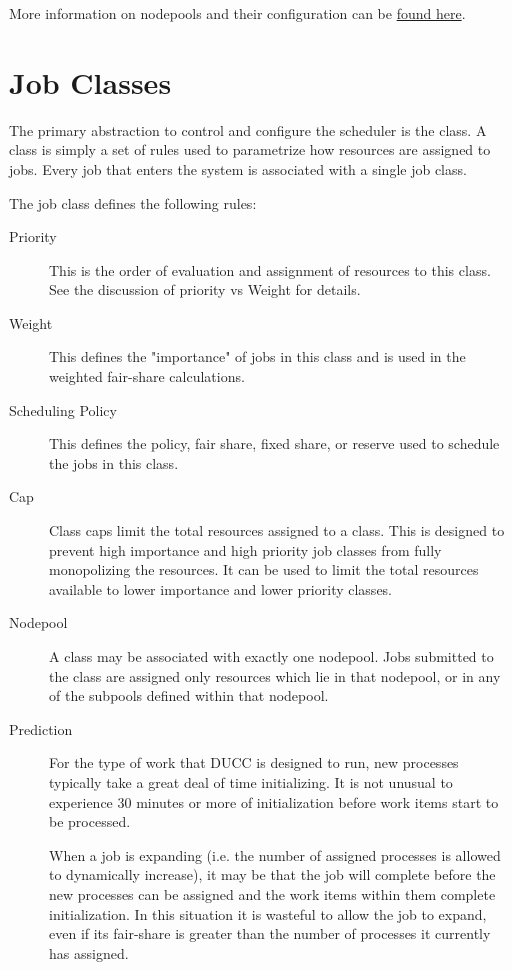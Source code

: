     More information on nodepools and their configuration can be \hyperref[subsec:nodepools]{found here}.

    \section{Job Classes}
    \label{sec:rm.job-classes}
    The primary abstraction to control and configure the scheduler is the class. A class is simply a set 
    of rules used to parametrize how resources are assigned to jobs. Every job that enters the system is 
    associated with a single job class. 
    
    The job class defines the following rules: 
    
    \begin{description}
        \item[Priority] This is the order of evaluation and assignment of resources to this class. See
          the discussion of priority vs Weight for details. 

        \item[Weight] This defines the "importance" of jobs in this class and is used in the weighted
          fair-share calculations. 

        \item[Scheduling Policy] This defines the policy, fair share, fixed share, or reserve used to
          schedule the jobs in this class.

        \item[Cap] Class caps limit the total resources assigned to a class. This is designed to prevent
          high importance and high priority job classes from fully monopolizing the resources. It can be
          used to limit the total resources available to lower importance and lower priority classes.

        \item[Nodepool] A class may be associated with exactly one nodepool. Jobs submitted to the class
          are assigned only resources which lie in that nodepool, or in any of the subpools defined
          within that nodepool.

        \item[Prediction] For the type of work that DUCC is designed to run, new processes typically take
          a great deal of time initializing. It is not unusual to experience 30 minutes or more of
          initialization before work items start to be processed.

          When a job is expanding (i.e. the number of assigned processes is allowed to dynamically 
          increase), it may be that the job will complete before the new processes can be assigned and 
          the work items within them complete initialization. In this situation it is wasteful to allow the 
          job to expand, even if its fair-share is greater than the number of processes it currently has 
          assigned. 
          

\end{description}
